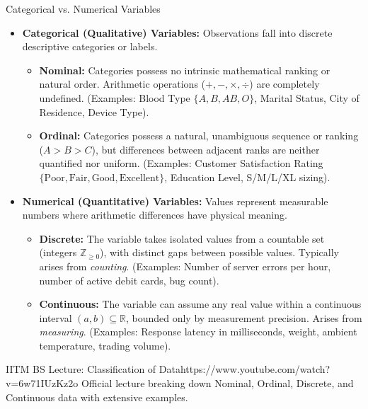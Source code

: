 \begin{definitionbox}{Categorical vs. Numerical Variables}
\begin{itemize}
    \item \textbf{Categorical (Qualitative) Variables:} Observations fall into discrete descriptive categories or labels.
    \begin{itemize}
        \item \textbf{Nominal:} Categories possess no intrinsic mathematical ranking or natural order. Arithmetic operations ($+, -, \times, \div$) are completely undefined. (Examples: Blood Type $\{A, B, AB, O\}$, Marital Status, City of Residence, Device Type).
        \item \textbf{Ordinal:} Categories possess a natural, unambiguous sequence or ranking ($A > B > C$), but differences between adjacent ranks are neither quantified nor uniform. (Examples: Customer Satisfaction Rating $\{\text{Poor}, \text{Fair}, \text{Good}, \text{Excellent}\}$, Education Level, S/M/L/XL sizing).
    \end{itemize}
    \item \textbf{Numerical (Quantitative) Variables:} Values represent measurable numbers where arithmetic differences have physical meaning.
    \begin{itemize}
        \item \textbf{Discrete:} The variable takes isolated values from a countable set (integers $\mathbb{Z}_{\ge 0}$), with distinct gaps between possible values. Typically arises from \emph{counting}. (Examples: Number of server errors per hour, number of active debit cards, bug count).
        \item \textbf{Continuous:} The variable can assume any real value within a continuous interval $(a, b) \subseteq \mathbb{R}$, bounded only by measurement precision. Arises from \emph{measuring}. (Examples: Response latency in milliseconds, weight, ambient temperature, trading volume).
    \end{itemize}
\end{itemize}
\end{definitionbox}

\begin{videocard}{IITM BS Lecture: Classification of Data}{https://www.youtube.com/watch?v=6w71IUzKz2o}
Official lecture breaking down Nominal, Ordinal, Discrete, and Continuous data with extensive examples.
\end{videocard}


